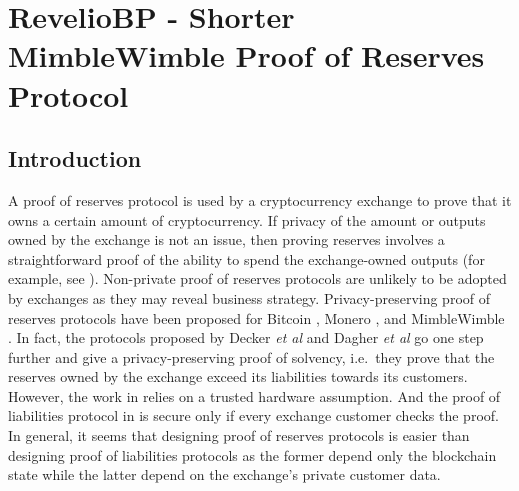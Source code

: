 \newcommand{\RBtitle}{\textnormal{\big {\fontfamily{qag}\selectfont RevelioBP}} }


\chapter{RevelioBP - Shorter MimbleWimble Proof of Reserves Protocol}
\label{chap:revBP}

\section{Introduction}
A proof of reserves protocol is used by a cryptocurrency exchange to prove that it owns a certain amount of cryptocurrency. If privacy of the amount or outputs owned by the exchange is not an issue, then proving reserves involves a straightforward proof of the ability to spend the exchange-owned outputs (for example, see \cite{BlockstreamProofOfReserves}). Non-private proof of reserves protocols are unlikely to be adopted by exchanges as they may reveal business strategy. Privacy-preserving proof of reserves protocols have been proposed for Bitcoin \cite{Decker2015,Dagher2015}, Monero \cite{Dutta2019a}, and MimbleWimble \cite{Dutta2019b}. In fact, the protocols proposed by Decker \textit{et al} \cite{Decker2015} and Dagher \textit{et al} \cite{Dagher2015} go one step further and give a privacy-preserving proof of solvency, i.e.~they prove that the reserves owned by the exchange exceed its liabilities towards its customers. However, the work in \cite{Decker2015} relies on a trusted hardware assumption. And the proof of liabilities protocol in \cite{Dagher2015} is secure only if every exchange customer checks the proof. In general, it seems that designing proof of reserves protocols is easier than designing proof of liabilities protocols as the former depend only the blockchain state while the latter depend on the exchange's private customer data.

